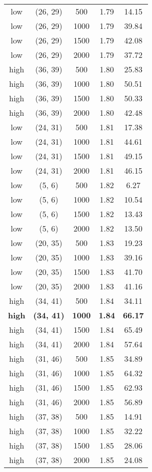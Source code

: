\begin{tabular}{c c c c c}
low & (26, 29) &  500 & 1.79 & 14.15 \\
low & (26, 29) &  1000 & 1.79 & 39.84 \\
low & (26, 29) &  1500 & 1.79 & 42.08 \\
low & (26, 29) &  2000 & 1.79 & 37.72 \\
high & (36, 39) &  500 & 1.80 & 25.83 \\
high & (36, 39) &  1000 & 1.80 & 50.51 \\
high & (36, 39) &  1500 & 1.80 & 50.33 \\
high & (36, 39) &  2000 & 1.80 & 42.48 \\
low & (24, 31) &  500 & 1.81 & 17.38 \\
low & (24, 31) &  1000 & 1.81 & 44.61 \\
low & (24, 31) &  1500 & 1.81 & 49.15 \\
low & (24, 31) &  2000 & 1.81 & 46.15 \\
low & (5, 6) &  500 & 1.82 & 6.27 \\
low & (5, 6) &  1000 & 1.82 & 10.54 \\
low & (5, 6) &  1500 & 1.82 & 13.43 \\
low & (5, 6) &  2000 & 1.82 & 13.50 \\
low & (20, 35) &  500 & 1.83 & 19.23 \\
low & (20, 35) &  1000 & 1.83 & 39.16 \\
low & (20, 35) &  1500 & 1.83 & 41.70 \\
low & (20, 35) &  2000 & 1.83 & 41.16 \\
high & (34, 41) &  500 & 1.84 & 34.11 \\
\textbf{high} & \textbf{(34, 41)} & \textbf{ 1000} & \textbf{1.84} & \textbf{66.17} \\
high & (34, 41) &  1500 & 1.84 & 65.49 \\
high & (34, 41) &  2000 & 1.84 & 57.64 \\
high & (31, 46) &  500 & 1.85 & 34.89 \\
high & (31, 46) &  1000 & 1.85 & 64.32 \\
high & (31, 46) &  1500 & 1.85 & 62.93 \\
high & (31, 46) &  2000 & 1.85 & 56.89 \\
high & (37, 38) &  500 & 1.85 & 14.91 \\
high & (37, 38) &  1000 & 1.85 & 32.22 \\
high & (37, 38) &  1500 & 1.85 & 28.06 \\
high & (37, 38) &  2000 & 1.85 & 24.08 \\

\end{tabular}
